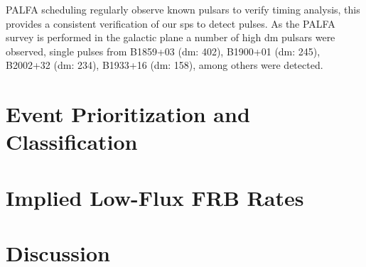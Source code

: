 \documentclass[a4paper,fleqn,usenatbib]{mnras}
\begin{document}


PALFA scheduling regularly observe known pulsars to verify timing analysis,
this provides a consistent verification of our \gls*{sps} to detect
pulses. As the PALFA survey is performed in the galactic plane a number of high
\gls*{dm} pulsars were observed, single pulses from B1859+03 (\gls*{dm}: 402),
B1900+01 (\gls*{dm}: 245), B2002+32 (\gls*{dm}: 234), B1933+16 (\gls*{dm}: 158),
among others were detected.



\section{Event Prioritization and Classification}
\label{sec:event_classify}


\section{Implied Low-Flux FRB Rates}
\label{sec:frb_rates}



\section{Discussion}
\label{sec:discuss}

\end{document}
